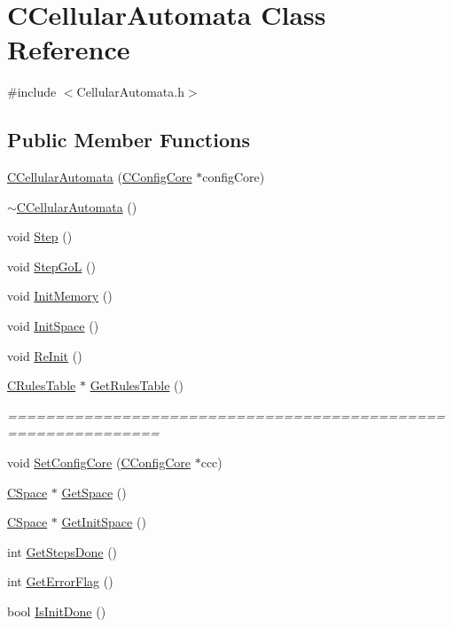 \hypertarget{classCCellularAutomata}{
\section{CCellularAutomata Class Reference}
\label{classCCellularAutomata}
}


{\ttfamily \#include $<$CellularAutomata.h$>$}\subsection*{Public Member Functions}
\begin{DoxyCompactItemize}
\item 
\hyperlink{classCCellularAutomata_a655184244b0dfb0fc760c8456c37544e}{CCellularAutomata} (\hyperlink{classCConfigCore}{CConfigCore} $\ast$configCore)
\item 
\hyperlink{classCCellularAutomata_aea01c28581d9683737ce36f38c1ac7f5}{$\sim$CCellularAutomata} ()
\item 
void \hyperlink{classCCellularAutomata_af5cdf03c18ba644e345daab376d210f9}{Step} ()
\item 
void \hyperlink{classCCellularAutomata_a5ec2f3241ecacde9250f140b4d93470c}{StepGoL} ()
\item 
void \hyperlink{classCCellularAutomata_ade214ca0b4f554561de04ad477ae37c7}{InitMemory} ()
\item 
void \hyperlink{classCCellularAutomata_ab1df4fc7a5d32eed82d62e99aaec3f1f}{InitSpace} ()
\item 
void \hyperlink{classCCellularAutomata_ade3b43b44d2e2cc448d5c896ae389957}{ReInit} ()
\item 
\hyperlink{classCRulesTable}{CRulesTable} $\ast$ \hyperlink{classCCellularAutomata_a4bdd830043f0e68a762e5da35d0a092a}{GetRulesTable} ()
\begin{DoxyCompactList}\small\item\em ============================================================== \item\end{DoxyCompactList}\item 
void \hyperlink{classCCellularAutomata_a0ba78441e4834407637d70e5ccf98e79}{SetConfigCore} (\hyperlink{classCConfigCore}{CConfigCore} $\ast$ccc)
\item 
\hyperlink{classCSpace}{CSpace} $\ast$ \hyperlink{classCCellularAutomata_a811ef34c9aac8e7c9d9dffc1cf69b959}{GetSpace} ()
\item 
\hyperlink{classCSpace}{CSpace} $\ast$ \hyperlink{classCCellularAutomata_ab11e05819885f5ce5450d5ea10d073d8}{GetInitSpace} ()
\item 
int \hyperlink{classCCellularAutomata_a4de26e7af894bb68740fb88e5e84bde7}{GetStepsDone} ()
\item 
int \hyperlink{classCCellularAutomata_ad0e09d8cc86ac519ccb237c77d4a88cc}{GetErrorFlag} ()
\item 
bool \hyperlink{classCCellularAutomata_a1818fe798c2bbcd3028b6dbe6f671965}{IsInitDone} ()
\end{DoxyCompactItemize}
